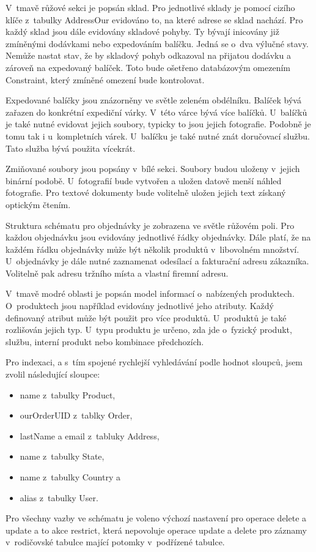 \documentclass[thesis=B,czech]{FITthesis}[2012/06/26]
\begin{document}
	V~tmavě růžové sekci je popsán sklad. Pro jednotlivé sklady je pomocí cizího klíče z~tabulky AddressOur evidováno to, na které adrese se sklad nachází. Pro každý sklad jsou dále evidovány skladové pohyby. Ty bývají inicovány již zmíněnými dodávkami nebo expedováním balíčku. Jedná se o~dva výlučné stavy. Nemůže nastat stav, že by skladový pohyb odkazoval na přijatou dodávku a zároveň na expedovaný balíček. Toto bude ošetřeno databázovým omezením Constraint, který zmíněné omezení bude kontrolovat.
	
	Expedované balíčky jsou znázorněny ve světle zeleném obdélníku. Balíček bývá zařazen do konkrétní expediční várky. V~této várce bývá více balíčků. U~balíčků je také nutné evidovat jejich soubory, typicky to jsou jejich fotografie. Podobně je tomu tak i u~kompletních várek. U~balíčku je také nutné znát doručovací službu. Tato služba bývá použita vícekrát. 
	
	Zmiňované soubory jsou popsány v~bílé sekci. Soubory budou uloženy v~jejich binární podobě. U~fotografií bude vytvořen a uložen datově menší náhled fotografie. Pro textové dokumenty bude volitelně uložen jejich text získaný optickým čtením.

	Struktura schématu pro objednávky je zobrazena ve světle růžovém poli. Pro každou objednávku jsou evidovány jednotlivé řádky objednávky. Dále platí, že na každém řádku objednávky může být několik produktů v~libovolném množství. U~objednávky je dále nutné zaznamenat odesílací a fakturační adresu zákazníka. Volitelně pak adresu tržního místa a vlastní firemní adresu.
	
	V~tmavě modré oblasti je popsán model informací o~nabízených produktech. O~produktech jsou například evidovány jednotlivé jeho atributy. Každý definovaný atribut může být použit pro více produktů. U~produktů je také rozlišován jejich typ. U~typu produktu je určeno, zda jde o~fyzický produkt, službu, interní produkt nebo kombinace předchozích.
	
	Pro indexaci, a s~tím spojené rychlejší vyhledávání podle hodnot sloupců, jsem zvolil následující sloupce: 
	\begin{itemize}
		\item name z~tabulky Product,
		\item ourOrderUID z~tablky Order,
		\item lastName a email z~tabluky Address,
		\item name z~tabulky State,
		\item name z~tabulky Country a
		\item alias z~tabulky User.
	\end{itemize}
	Pro všechny vazby ve schématu je voleno výchozí nastavení pro operace delete a update a to akce restrict, která nepovoluje operace update a delete pro záznamy v~rodičovské tabulce mající potomky v~podřízené tabulce.
	
\end{document}
